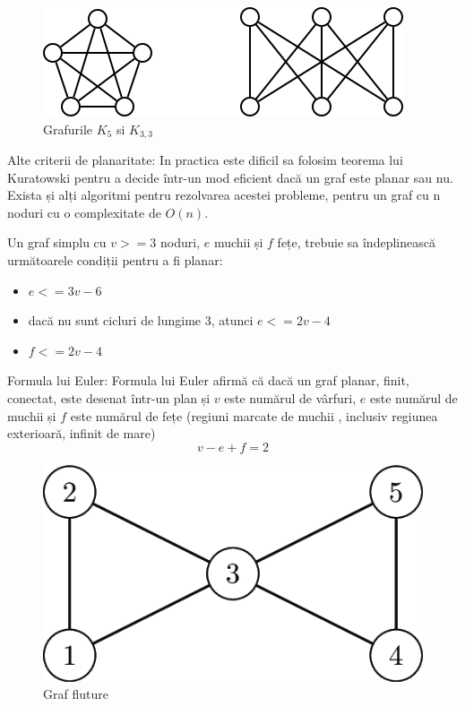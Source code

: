 \begin{figure}[H]
    \begin{center}
        \includegraphics[scale=0.7]{imagini/graf/notplanar.png}        
    \end{center}
    \caption{Grafurile \(K_5\) si \(K_{3,3}\)}
    \label{fig:tabs}
\end{figure}

Alte criterii de planaritate:\newline
In practica este dificil sa folosim teorema lui Kuratowski pentru a decide într-un mod eficient dacă un graf este planar sau nu. 
Exista și alți algoritmi pentru rezolvarea acestei probleme, pentru un graf cu n noduri cu o complexitate de \(O(n)\).

Un graf simplu  cu \(v>=3\) noduri, \(e\) muchii și \(f\) fețe, trebuie sa îndeplinească următoarele condiții pentru a fi planar:
\begin{itemize}
    \item  \(e<=3v-6\)
    \item  dacă nu sunt cicluri de lungime \(3\), atunci \(e<=2v-4\) 
    \item  \(f<=2v-4\)
\end{itemize}

Formula lui Euler: \newline
Formula lui Euler afirmă că dacă un graf planar, finit, conectat, este desenat într-un plan și \(v\) este numărul de vârfuri, 
\(e\) este numărul de muchii și \(f\) este numărul de fețe (regiuni marcate de muchii , inclusiv regiunea exterioară, infinit de mare)
\[v-e+f=2\]

\begin{figure}[H]
    \begin{center}
        \includegraphics[scale=0.5]{imagini/graf/butterfly.png}
        \caption{Graf fluture}
        \label{fig:tabs}
    \end{center}    
\end{figure}


